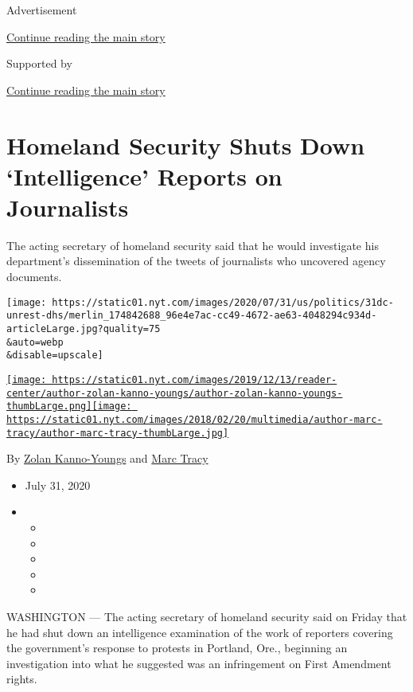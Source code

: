 Advertisement

\protect\hyperlink{after-top}{Continue reading the main story}

Supported by

\protect\hyperlink{after-sponsor}{Continue reading the main story}

\hypertarget{homeland-security-shuts-down-intelligence-reports-on-journalists}{%
\section{Homeland Security Shuts Down `Intelligence' Reports on
Journalists}\label{homeland-security-shuts-down-intelligence-reports-on-journalists}}

The acting secretary of homeland security said that he would investigate
his department's dissemination of the tweets of journalists who
uncovered agency documents.

\texttt{[image: https://static01.nyt.com/images/2020/07/31/us/politics/31dc-unrest-dhs/merlin\_174842688\_96e4e7ac-cc49-4672-ae63-4048294c934d-articleLarge.jpg?quality=75\\\&auto=webp\\\&disable=upscale]}

\href{https://www.nytimes.com/by/zolan-kanno-youngs}{\texttt{[image: https://static01.nyt.com/images/2019/12/13/reader-center/author-zolan-kanno-youngs/author-zolan-kanno-youngs-thumbLarge.png]}}\href{https://www.nytimes.com/by/marc-tracy}{\texttt{[image: https://static01.nyt.com/images/2018/02/20/multimedia/author-marc-tracy/author-marc-tracy-thumbLarge.jpg]}}

By \href{https://www.nytimes.com/by/zolan-kanno-youngs}{Zolan
Kanno-Youngs} and \href{https://www.nytimes.com/by/marc-tracy}{Marc
Tracy}

\begin{itemize}
\item
  July 31, 2020
\item
  \begin{itemize}
  \item
  \item
  \item
  \item
  \item
  \end{itemize}
\end{itemize}

WASHINGTON --- The acting secretary of homeland security said on Friday
that he had shut down an intelligence examination of the work of
reporters covering the government's response to protests in Portland,
Ore., beginning an investigation into what he suggested was an
infringement on First Amendment rights.

